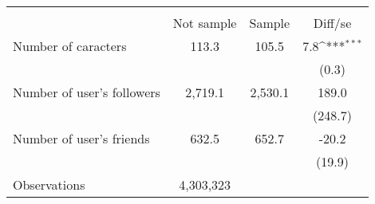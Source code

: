 {
\def\sym#1{\ifmmode^{#1}\else\(^{#1}\)\fi}
\begin{tabular}{l*{1}{ccc}}
\hline\hline
                    &\multicolumn{3}{c}{}                           \\
                    &  Not sample&      Sample&     Diff/se         \\
\hline
Number of caracters &       113.3&       105.5&         7.8\sym{***}\\
                    &            &            &       (0.3)         \\
Number of user's followers&     2,719.1&     2,530.1&       189.0         \\
                    &            &            &     (248.7)         \\
Number of user's friends&       632.5&       652.7&       -20.2         \\
                    &            &            &      (19.9)         \\
\hline
Observations        &   4,303,323&            &                     \\
\hline\hline
\end{tabular}
}
